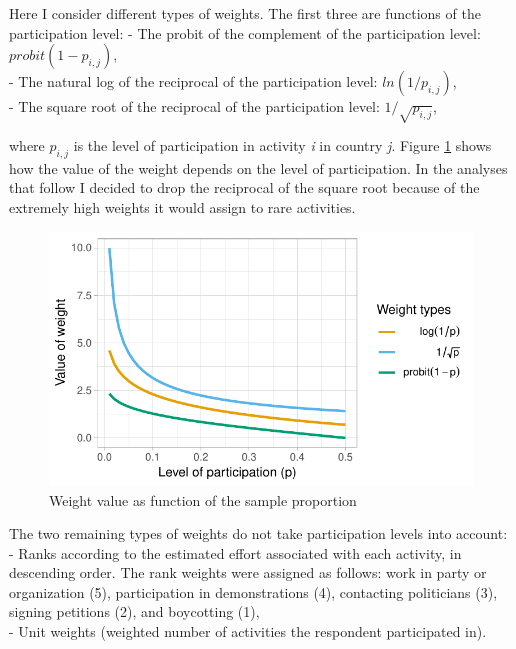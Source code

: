 \documentclass[12pt,]{article}
\begin{document}
Here I consider different types of weights. The first three are functions of the participation level:
- The probit of the complement of the participation level: \(probit(1 - p_{i,j})\),\\
- The natural log of the reciprocal of the participation level: \(ln(1 / p_{i,j})\),\\
- The square root of the reciprocal of the participation level: \(1/\sqrt{p_{i,j}}\),

where \(p_{i,j}\) is the level of participation in activity \emph{i} in country \emph{j}. Figure \ref{fig:weights} shows how the value of the weight depends on the level of participation. In the analyses that follow I decided to drop the reciprocal of the square root because of the extremely high weights it would assign to rare activities.

\begin{figure}[H]

{\centering \includegraphics{report_files/figure-latex/weights-1} 

}

\caption{Weight value as function of the sample proportion}\label{fig:weights}
\end{figure}

The two remaining types of weights do not take participation levels into account:\\
- Ranks according to the estimated effort associated with each activity, in descending order. The rank weights were assigned as follows: work in party or organization (5), participation in demonstrations (4), contacting politicians (3), signing petitions (2), and boycotting (1),\\
- Unit weights (weighted number of activities the respondent participated in).
\end{document}
